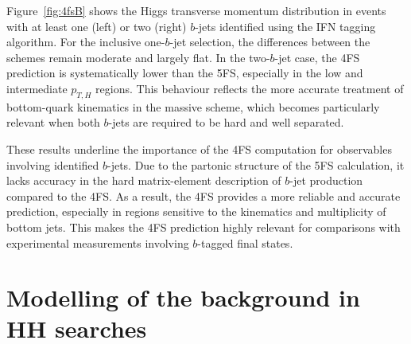 \documentclass[11pt,a4paper]{article}
\begin{document}

Figure~\ref{fig:4fsB} shows the Higgs transverse momentum distribution in events with at least one (left) or two (right) $b$-jets identified using the IFN tagging algorithm. For the inclusive one-$b$-jet selection, the differences between the schemes remain moderate and largely flat. In the two-$b$-jet case, the 4FS prediction is systematically lower than the 5FS, especially in the low and intermediate $p_{T,H}$ regions. This behaviour reflects the more accurate treatment of bottom-quark kinematics in the massive scheme, which becomes particularly relevant when both $b$-jets are required to be hard and well separated.

These results underline the importance of the 4FS computation for observables involving identified $b$-jets. Due to the partonic structure of the 5FS calculation, it lacks accuracy in the hard matrix-element description of $b$-jet production compared to the 4FS. As a result, the 4FS provides a more reliable and accurate prediction, especially in regions sensitive to the kinematics and multiplicity of bottom jets. This makes the 4FS prediction highly relevant for comparisons with experimental measurements involving $b$-tagged final states.


\section{Modelling of the  background in HH searches}\label{sec:HH}
\end{document}
